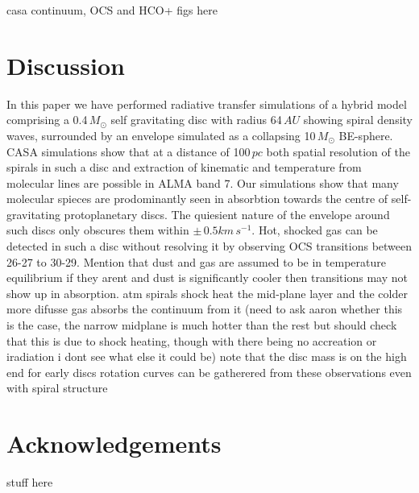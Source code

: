 \documentclass[useAMS,usenatbib]{mn2e}
\begin{document}


casa continuum, OCS and HCO+ figs here


\section{Discussion}

In this paper we have performed radiative transfer simulations of a hybrid model comprising a 0.4$\, M_\odot$ self gravitating disc with radius 64$\,AU$ showing spiral density waves, surrounded by an envelope simulated as a collapsing 10$\,M_\odot$ BE-sphere. CASA simulations show that at a distance of 100$\,pc$ both spatial resolution of the spirals in such a disc and extraction of kinematic and temperature from molecular lines are possible in ALMA band 7. Our simulations show that many  molecular spieces are prodominantly seen in absorbtion towards the centre of  self-gravitating protoplanetary discs.\newline
The quiesient nature of the envelope around such discs only obscures them within $\pm\,0.5 km\,s^{-1}$.\newline
Hot, shocked gas can be detected in such a disc without resolving it by observing OCS transitions between 26-27 to 30-29.\newline
Mention that dust and gas are assumed to be in temperature equilibrium if they arent and dust is significantly cooler then transitions may not show up in absorption. atm spirals shock heat the mid-plane layer and the colder more difusse gas absorbs the continuum from it (need to ask aaron whether this is the case, the narrow midplane is much hotter than the rest but should check that this is due to shock heating, though with there being no accreation or iradiation i dont see what else it could be)\newline
note that the disc mass is on the high end for early discs\newline
rotation curves can be gatherered from these observations even with spiral structure\newline




\section*{Acknowledgements}

stuff here
\end{document}

